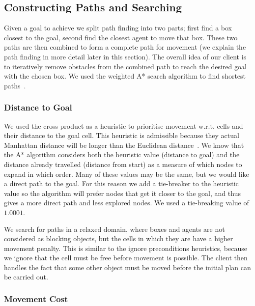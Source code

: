 \subsection{Constructing Paths and Searching}
\label{sec:constructing paths and searching}

Given a goal to achieve we split path finding into two parts; first find a box closest to the goal, second find the closest agent to move that box.
These two paths are then combined to form a complete path for movement (we explain the path finding in more detail later in this section).
The overall idea of our client is to iteratively remove obstacles from the combined path to reach the desired goal with the chosen box.
We used the weighted A* search algorithm to find shortest paths~\cite{pathfinding2016redblobgames,russell2009modern,pohl1969first}.

\subsubsection{Distance to Goal}

We used the cross product as a heuristic to prioritise movement w.r.t. cells and their distance to the goal cell.
This heuristic is admissible because they actual Manhattan distance will be longer than the Euclidean distance~\cite{russell2009modern}.
We know that the A* algorithm considers both the heuristic value (distance to goal) and the distance already travelled (distance from start) as a measure of which nodes to expand in which order.
Many of these values may be the same, but we would like a direct path to the goal.
For this reason we add a tie-breaker to the heuristic value so the algorithm will prefer nodes that get it closer to the goal, and thus gives a more direct path and less explored nodes.
We used a tie-breaking value of $1.0001$.~\cite{pathfinding2016redblobgames}

We search for paths in a relaxed domain, where boxes and agents are not considered as blocking objects, but the cells in which they are have a higher movement penalty.
This is similar to the ignore preconditions heuristics, because we ignore that the cell must be free before movement is possible.
The client then handles the fact that some other object must be moved before the initial plan can be carried out.

\subsubsection{Movement Cost}

